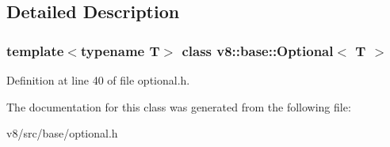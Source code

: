 \subsection{Detailed Description}
\subsubsection*{template$<$typename T$>$\newline
class v8\+::base\+::\+Optional$<$ T $>$}



Definition at line 40 of file optional.\+h.



The documentation for this class was generated from the following file\+:\begin{DoxyCompactItemize}
\item 
v8/src/base/optional.\+h\end{DoxyCompactItemize}
